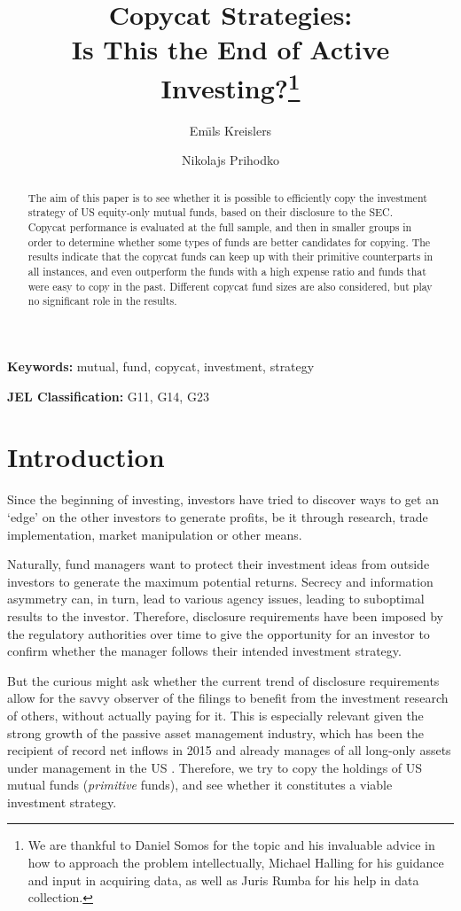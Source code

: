 \documentclass[12pt, a4]{article}
\title{Copycat Strategies:\\ Is This the End of Active Investing?\thanks{We are thankful to Daniel Somos for the topic and his invaluable advice in how to approach the problem intellectually, Michael Halling for his guidance and input in acquiring data, as well as Juris Rumba for his help in data collection.}}
\author{Em\={\i}ls Kreislers \and Nikolajs Prihodko}
\date{\parbox{\linewidth}{\centering%
		Supervisor: Michael Halling\endgraf\vspace{6ex}
		Stockholm School of Economics\endgraf\medskip
		May 2016
		}}
\begin{document}
\maketitle

\begin{abstract} \noindent %
	The aim of this paper is to see whether it is possible to efficiently copy the investment strategy of \textsc{US} equity-only mutual funds, based on their disclosure to the \textsc{SEC}. Copycat performance is evaluated at the full sample, and then in smaller groups in order to determine whether some types of funds are better candidates for copying. The results indicate that the copycat funds can keep up with their primitive counterparts in all instances, and even outperform the funds with a high expense ratio and funds that were easy to copy in the past. Different copycat fund sizes are also considered, but play no significant role in the results.
\end{abstract}

\textbf{Keywords:} mutual, fund, copycat, investment, strategy
	
\textbf{\textsc{JEL} Classification:} G11, G14, G23

\newpage

\tableofcontents

\clearpage




\section {Introduction}

Since the beginning of investing, investors have tried to discover ways to get an `edge' on the other investors to generate profits, be it through research, trade implementation, market manipulation or other means.

Naturally, fund managers want to protect their investment ideas from outside investors to generate the maximum potential returns. Secrecy and information asymmetry can, in turn, lead to various agency issues, leading to suboptimal results to the investor. Therefore, disclosure requirements have been imposed by the regulatory authorities over time to give the opportunity for an investor to confirm whether the manager follows their intended investment strategy.

But the curious might ask whether the current trend of disclosure requirements allow for the savvy observer of the filings to benefit from the investment research of others, without actually paying for it. This is especially relevant given the strong growth of the passive asset management industry, which has been the recipient of record net inflows in 2015 and already manages  of all long-only assets under management in the \textsc{US} \citep{bloomberg}. Therefore, we try to copy the holdings of \textsc{US} mutual funds (\textit{primitive} funds), and see whether it constitutes a viable investment strategy.
\end{document}
